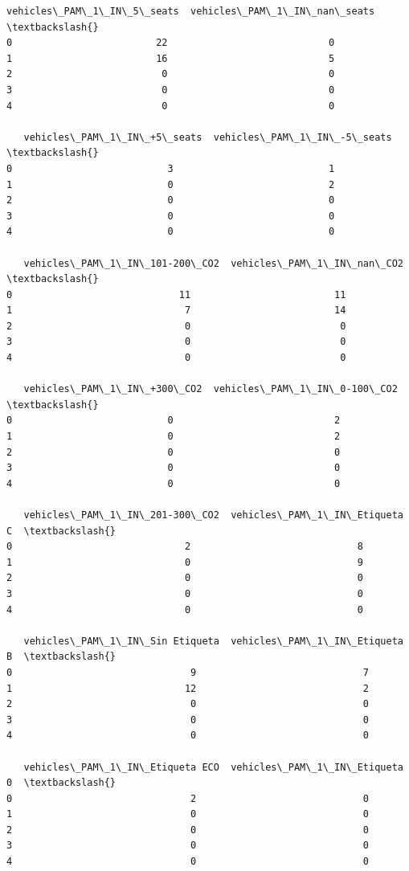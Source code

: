 \documentclass[11pt]{article}
\begin{document}
\begin{tcolorbox}[breakable, size=fbox, boxrule=.5pt, pad at break*=1mm, opacityfill=0]
\begin{Verbatim}[commandchars=\\\{\}]
   vehicles\_PAM\_1\_IN\_5\_seats  vehicles\_PAM\_1\_IN\_nan\_seats  \textbackslash{}
0                         22                            0
1                         16                            5
2                          0                            0
3                          0                            0
4                          0                            0

   vehicles\_PAM\_1\_IN\_+5\_seats  vehicles\_PAM\_1\_IN\_-5\_seats  \textbackslash{}
0                           3                           1
1                           0                           2
2                           0                           0
3                           0                           0
4                           0                           0

   vehicles\_PAM\_1\_IN\_101-200\_CO2  vehicles\_PAM\_1\_IN\_nan\_CO2  \textbackslash{}
0                             11                         11
1                              7                         14
2                              0                          0
3                              0                          0
4                              0                          0

   vehicles\_PAM\_1\_IN\_+300\_CO2  vehicles\_PAM\_1\_IN\_0-100\_CO2  \textbackslash{}
0                           0                            2
1                           0                            2
2                           0                            0
3                           0                            0
4                           0                            0

   vehicles\_PAM\_1\_IN\_201-300\_CO2  vehicles\_PAM\_1\_IN\_Etiqueta C  \textbackslash{}
0                              2                             8
1                              0                             9
2                              0                             0
3                              0                             0
4                              0                             0

   vehicles\_PAM\_1\_IN\_Sin Etiqueta  vehicles\_PAM\_1\_IN\_Etiqueta B  \textbackslash{}
0                               9                             7
1                              12                             2
2                               0                             0
3                               0                             0
4                               0                             0

   vehicles\_PAM\_1\_IN\_Etiqueta ECO  vehicles\_PAM\_1\_IN\_Etiqueta 0  \textbackslash{}
0                               2                             0
1                               0                             0
2                               0                             0
3                               0                             0
4                               0                             0


\end{Verbatim}
\end{tcolorbox}
\end{document}
